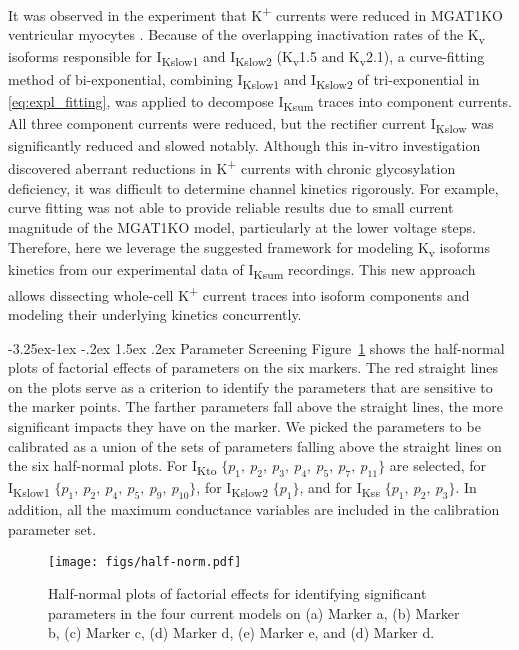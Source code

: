 \documentclass[11pt]{article}
\makeatletter
\renewcommand\subsection{\@startsection{subsection}{2}{\z@}%
                                     {-3.25ex\@plus -1ex \@minus -.2ex}%
                                     {1.5ex \@plus .2ex}%
                                     {\normalfont\fontfamily{phv}\fontsize{14}{17}\bfseries}}
\makeatother
\begin{document}
It was observed in the experiment that K\textsuperscript{+} currents were reduced in MGAT1KO ventricular myocytes \citep{ednie2019reduced}. Because of the overlapping inactivation rates of the K\textsubscript{v} isoforms responsible for I\textsubscript{Kslow1} and I\textsubscript{Kslow2} (K\textsubscript{v}1.5 and K\textsubscript{v}2.1), a curve-fitting method of bi-exponential, combining I\textsubscript{Kslow1} and I\textsubscript{Kslow2} of tri-exponential in \eqref{eq:expl_fitting}, was applied to decompose I\textsubscript{Ksum} traces into component currents. All three component currents were reduced, but the rectifier current I\textsubscript{Kslow} was significantly reduced and slowed notably. Although this in-vitro investigation discovered aberrant reductions in K\textsuperscript{+} currents with chronic glycosylation deficiency, it was difficult to determine channel kinetics rigorously. For example, curve fitting was not able to provide reliable results due to small current magnitude of the MGAT1KO model, particularly at the lower voltage steps. Therefore, here we leverage the suggested framework for modeling K\textsubscript{v} isoforms kinetics from our experimental data of I\textsubscript{Ksum} recordings. This new approach allows dissecting whole-cell K\textsuperscript{+} current traces into isoform components and modeling their underlying kinetics concurrently.

\subsection{Parameter Screening}
Figure~\ref{fig:half-norm} shows the half-normal plots of factorial effects of parameters on the six markers. The red straight lines on the plots serve as a criterion to identify the parameters that are sensitive to the marker points. The farther parameters fall above the straight lines, the more significant impacts they have on the marker. We picked the parameters to be calibrated as a union of the sets of parameters falling above the straight lines on the six half-normal plots. For I\textsubscript{Kto} $\{p_{1},\ p_{2},\ p_{3},\ p_{4},\ p_{5},\ p_{7},\ p_{11}\}$ are selected, for I\textsubscript{Kslow1} $\{p_{1},\ p_{2},\ p_{4},\ p_{5},\ p_{9},\ p_{10}\}$, for I\textsubscript{Kslow2} $\{p_{1}\}$, and for I\textsubscript{Kss} $\{p_{1},\ p_{2},\ p_{3}\}$. In addition, all the maximum conductance variables are included in the calibration parameter set. 
\begin{figure}
    \centering
    \texttt{[image: figs/half-norm.pdf]}
    \caption{Half-normal plots of factorial effects for identifying significant parameters in the four current models on (a) Marker a, (b) Marker b, (c) Marker c, (d) Marker d, (e) Marker e, and (d) Marker d.}
    \label{fig:half-norm}
\end{figure}
\end{document}
